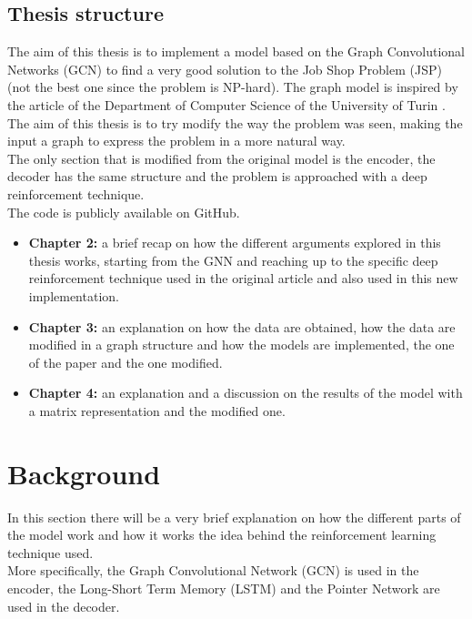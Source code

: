 \documentclass[12pt]{book}
\begin{document}
\section{Thesis structure}
The aim of this thesis is to implement a model based on the Graph Convolutional Networks (GCN) to find a very good solution to the Job Shop Problem (JSP) (not the best one since the problem is NP-hard). The graph model is inspired by the article of the Department of Computer Science of the University of Turin \cite{LION17}. The aim of this thesis is to try modify the way the problem was seen, making the input a graph to express the problem in a more natural way.\\
The only section that is modified from the original model is the encoder, the decoder has the same structure and the problem is approached with a deep reinforcement technique.\\
The code is publicly available on GitHub\cite{GitHub}.
\begin{itemize}
    \item \textbf{Chapter 2:} a brief recap on how the different arguments explored in this thesis works, starting from the GNN and reaching up to the specific deep reinforcement technique used in the original article and also used in this new implementation.
    \item \textbf{Chapter 3:} an explanation on how the data are obtained, how the data are modified in a graph structure and how the models are implemented, the one of the paper and the one modified.
    \item \textbf{Chapter 4:} an explanation and a discussion on the results of the model with a matrix representation and the modified one.
\end{itemize}




\chapter{Background}
In this section there will be a very brief explanation on how the different parts of the model work and how it works the idea behind the reinforcement learning technique used.\\
More specifically, the Graph Convolutional Network (GCN) is used in the encoder, the Long-Short Term Memory (LSTM) and the Pointer Network are used in the decoder.
\end{document}
